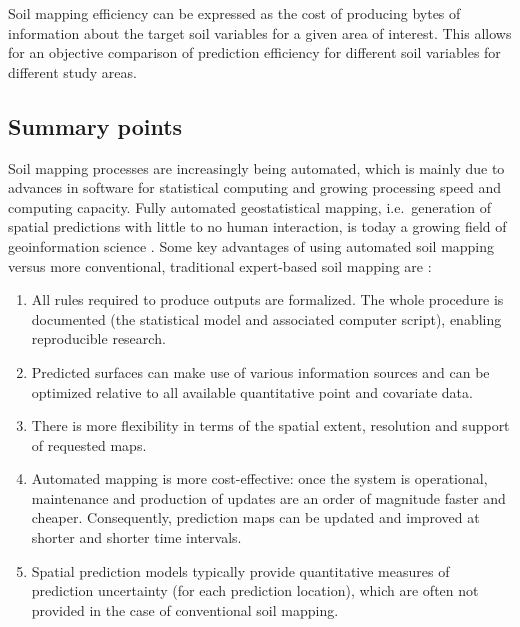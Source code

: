 \documentclass[graybox,natbib,nospthms,UStrade]{svmono}
\let\BeginKnitrBlock\begin \let\EndKnitrBlock\end
\let\BeginKnitrBlock\begin \let\EndKnitrBlock\end
\begin{document}
\BeginKnitrBlock{rmdnote}
Soil mapping efficiency can be expressed as the cost of producing bytes
of information about the target soil variables for a given area
of interest. This allows for an objective comparison of prediction
efficiency for different soil variables for different study areas.
\EndKnitrBlock{rmdnote}

\hypertarget{summary-points-2}{%
\subsection{Summary points}\label{summary-points-2}}

Soil mapping processes are increasingly being automated, which is mainly
due to advances in software for statistical computing and growing
processing speed and computing capacity. Fully automated geostatistical
mapping, i.e.~generation of spatial predictions with little to no human
interaction, is today a growing field of geoinformation science
\citep{Pebesma2011CompGeoSci, Brown2014JSS, Hengl2014SoilGrids1km}. Some
key advantages of using automated soil mapping versus more conventional,
traditional expert-based soil mapping are
\citep{heuvelink2010implications, Bivand2013Springer}:

\begin{enumerate}
\def\labelenumi{\arabic{enumi}.}
\item
  All rules required to produce outputs are formalized. The whole
  procedure is documented (the statistical model and associated
  computer script), enabling reproducible research.
\item
  Predicted surfaces can make use of various information sources and
  can be optimized relative to all available quantitative point and
  covariate data.
\item
  There is more flexibility in terms of the spatial extent, resolution
  and support of requested maps.
\item
  Automated mapping is more cost-effective: once the system is
  operational, maintenance and production of updates are an order of
  magnitude faster and cheaper. Consequently, prediction maps can be
  updated and improved at shorter and shorter time intervals.
\item
  Spatial prediction models typically provide quantitative measures of
  prediction uncertainty (for each prediction location), which are
  often not provided in the case of conventional soil mapping.
\end{enumerate}
\end{document}
